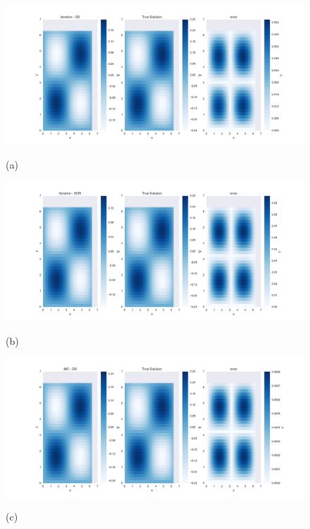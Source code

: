 \documentclass[pdftex,12pt,a4paper]{article}
\begin{document}
        \subsubsection*{}
        
            \begin{figure}[!h]
                \centering
                \includegraphics[scale=.5]{../plots/gs_sol_2d.pdf} \\
                \caption{(a)}
            \end{figure}
            
            \begin{figure}[!h]
                \centering
                \includegraphics[scale=.5]{../plots/sor_sol_2d.pdf} \\
                \caption{(b)}
            \end{figure}
            
            \begin{figure}[!h]
                \centering
                \includegraphics[scale=.5]{../plots/v_sol_2d.pdf} \\ 
                \caption{(c)}
            \end{figure}
            
\end{document}
